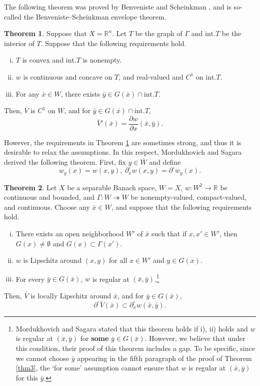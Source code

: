\documentclass[a4paper,12pt]{article}
\theoremstyle{definition}
\newtheorem{thm}{Theorem}
\begin{document}
The following theorem was proved by Benveniste and Scheinkman \cite{BS}, and is so-called the Benveniste--Scheinkman envelope theorem.

\begin{thm}\label{thm1}
Suppose that $X=\mathbb{R}^n$. Let $T$ be the graph of $\Gamma$ and $\mbox{int.}T$ be the interior of $T$. Suppose that the following requirements hold.
\begin{enumerate}[i)]
\item $T$ is convex and $\mbox{int.}T$ is nonempty.

\item $w$ is continuous and concave on $T$, and real-valued and $C^1$ on $\mbox{int.}T$.

\item For any $\bar{x}\in W$, there exists $\bar{y}\in G(\bar{x})\cap \mbox{int.}T$.
\end{enumerate}
Then, $\bar{V}$ is $C^1$ on $W$, and for $\bar{y}\in G(\bar{x})\cap \mbox{int.}T$,
\[\bar{V}'(\bar{x})=\frac{\partial w}{\partial x}(\bar{x},\bar{y}).\]
\end{thm}

However, the requirements in Theorem \ref{thm1} are sometimes strong, and thus it is desirable to relax the assumptions. In this respect, Mordukhovich and Sagara \cite{MS} derived the following theorem. First, fix $y\in \bar{W}$ and define
\[w_y(x)=w(x,y),\ \partial^{\circ}_xw(x,y)=\partial^{\circ}w_y(x).\]

\begin{thm}\label{thm2}
Let $X$ be a separable Banach space, $W=X$, $w:W^2\to \mathbb{R}$ be continuous and bounded, and $\Gamma:W\twoheadrightarrow W$ be nonempty-valued, compact-valued, and continuous. Choose any $\bar{x}\in W$, and suppose that the following requirements hold.
\begin{enumerate}[i)]
\item There exists an open neighborhood $W'$ of $\bar{x}$ such that if $x,x'\in W'$, then $G(x)\neq \emptyset$ and $G(x)\subset \Gamma(x')$.

\item $w$ is Lipschitz around $(x,y)$ for all $x\in W'$ and $y\in G(x)$.

\item For every $\bar{y}\in G(\bar{x})$, $w$ is regular at $(\bar{x},\bar{y})$.\footnote{Mordukhovich and Sagara \cite{MS} stated that this theorem holds if i), ii) holds and $w$ is regular at $(\bar{x},\bar{y})$ for {\bf some} $\bar{y}\in G(\bar{x})$. However, we believe that under this condition, their proof of this theorem includes a gap. To be specific, since we cannot choose $\bar{y}$ appearing in the fifth paragraph of the proof of Theorem \ref{thm3}, the `for some' assumption cannot ensure that $w$ is regular at $(\bar{x},\bar{y})$ for this $\bar{y}$.}
\end{enumerate}
Then, $\bar{V}$ is locally Lipschitz around $\bar{x}$, and for $\bar{y}\in G(\bar{x})$,
\[\partial^{\circ}\bar{V}(\bar{x})\subset \partial^{\circ}_xw(\bar{x},\bar{y}).\]
\end{thm}
\end{document}
